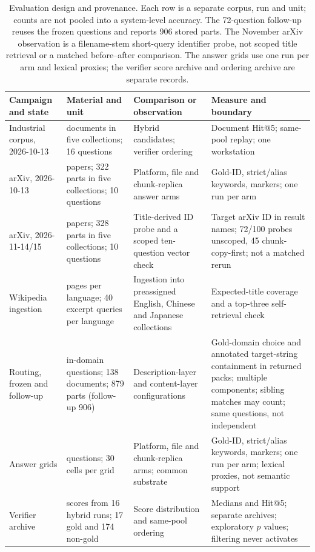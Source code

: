 \documentclass[final,5p,times,twocolumn]{elsarticle}
\begin{document}
\begin{table}[t]
\centering
\footnotesize
\setlength{\tabcolsep}{4pt}
\caption{Evaluation design and provenance. Each row is a separate corpus, run
and unit; counts are not pooled into a system-level accuracy. The 72-question
follow-up reuses the frozen questions and reports 906 stored parts. The
November arXiv observation is a filename-stem short-query identifier probe,
not scoped title retrieval or a matched before--after comparison. The answer
grids use one run per arm and lexical proxies; the verifier score archive and
ordering archive are separate records.}
\label{tab:eval-design}
\begin{tabular}{@{}>{\raggedright\arraybackslash}p{}>{\raggedright\arraybackslash}p{}>{\raggedright\arraybackslash}p{}>{\raggedright\arraybackslash}p{}@{}}
\toprule
Campaign and state & Material and unit & Comparison or observation & Measure and boundary\\
\midrule
Industrial corpus, 2026-10-13 & 42 documents in five collections; 16 questions & Hybrid candidates; verifier ordering & Document Hit@5; same-pool replay; one workstation\\
arXiv, 2026-10-13 & 100 papers; 322 parts in five collections; 10 questions & Platform, file and chunk-replica answer arms & Gold-ID, strict/alias keywords, markers; one run per arm\\
arXiv, 2026-11-14/15 & 100 papers; 328 parts in five collections; 10 questions & Title-derived ID probe and a scoped ten-question vector check & Target arXiv ID in result names; 72/100 probes unscoped, 45 chunk-copy-first; not a matched rerun\\
Wikipedia ingestion & 400 pages per language; 40 excerpt queries per language & Ingestion into preassigned English, Chinese and Japanese collections & Expected-title coverage and a top-three self-retrieval check\\
Routing, frozen and follow-up & 72 in-domain questions; 138 documents; 879 parts (follow-up 906) & Description-layer and content-layer configurations & Gold-domain choice and annotated target-string containment in returned packs; multiple components; sibling matches may count; same questions, not independent\\
Answer grids & 10 questions; 30 cells per grid & Platform, file and chunk-replica arms; common substrate & Gold-ID, strict/alias keywords, markers; one run per arm; lexical proxies, not semantic support\\
Verifier archive & 191 scores from 16 hybrid runs; 17 gold and 174 non-gold & Score distribution and same-pool ordering & Medians and Hit@5; separate archives; exploratory $p$ values; filtering never activates\\
\bottomrule
\end{tabular}
\end{table}


\end{document}
